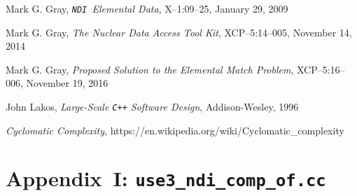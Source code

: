 \documentclass[12pt]{lamemo}
\newcommand{\NDI}{\texttt{NDI}}
\begin{document}
\newpage
\begin{thebibliography}{99}

 Mark G. Gray, \emph{\NDI\ Elemental Data},
  X--1:09--25, January 29, 2009
  
 Mark G. Gray, \emph{The Nuclear Data Access Tool
  Kit}, XCP--5:14--005, November 14, 2014

 Mark G. Gray, \emph{Proposed Solution to the
    Elemental Match Problem}, XCP--5:16--006, November 19, 2016

 John Lakos, \emph{Large-Scale \texttt{C++} Software
    Design}, Addison-Wesley, 1996

 \emph{Cyclomatic Complexity}, 
  https://en.wikipedia.org/wiki/Cyclomatic\_complexity  

\end{thebibliography}

\footnotesize
\newpage
\section{Appendix~I: \texttt{use3\_ndi\_comp\_of.cc}} 
\label{app:use3} 

\end{document}
